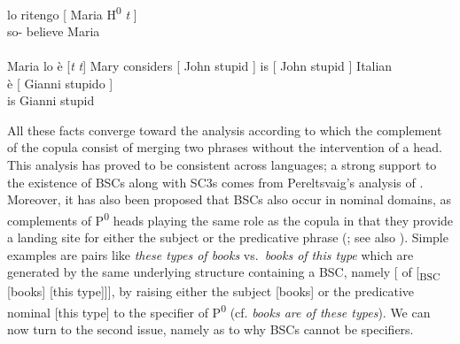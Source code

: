 \documentclass[output=paper]{langsci/langscibook}
\begin{document}
\ea\label{ex:key:28.3}
    \\
        \gll \llap{*}lo ritengo [ Maria H\textsuperscript{0} \emph{t} ]\\
            so-\Cl{} believe {} Maria {} {}\\
    \ex {}\\
        Maria lo è [\emph{t} \emph{t}]
    \ex Mary considers [ John stupid ]
    \ex \makebox[0pt][r]{*}is [ John stupid ]
    \ex Italian\\
        \gll \llap{*}è [ Gianni stupido ]\\
                is {} Gianni stupid\\
    \z
\z\largerpage[-2]

All these facts converge toward the analysis according to which the complement
of the copula consist of merging two phrases without the
intervention of a head. This analysis has proved to be consistent across
languages; a strong support to the existence of \glspl{BSC}
along with \glspl{SC3} comes from Pereltsvaig's analysis of 
\citep{Pereltsvaig2007}. Moreover, it has also been proposed that
\glspl{BSC} also occur in nominal domains, as complements of
P\textsuperscript{0} heads playing the same role as the copula in
that they provide a landing site for either the subject or the
predicative phrase (\citealt{Moro2000}; see also
\citealt{Kayne1994,denDikken1997,Zamparelli2000}). Simple
examples are pairs like \emph{these types of books} vs.\ \emph{books of this
type} which are generated by the same underlying structure containing a
\gls{BSC}, namely [ of [\textsubscript{BSC} [books] [this type]]], by raising
either the subject [books] or the predicative nominal [this
type] to the specifier of P\textsuperscript{0} (cf. \emph{books are of these
types}). We can now turn to the second issue, namely as to why
\glspl{BSC} cannot be specifiers.
\end{document}
